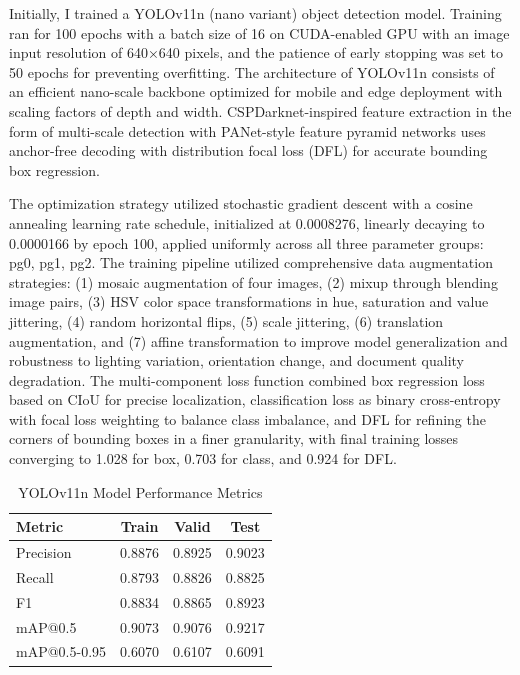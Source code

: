\documentclass[conference,twocolumn]{IEEEtran}
\begin{document}
Initially, I trained a YOLOv11n (nano variant) \cite{ref15} object detection
model. Training ran for 100 epochs with a batch size of 16 on
CUDA-enabled GPU with an image input resolution of 640×640 pixels, and
the patience of early stopping was set to 50 epochs for preventing
overfitting. The architecture of YOLOv11n consists of an efficient
nano-scale backbone optimized for mobile and edge deployment with
scaling factors of depth and width. CSPDarknet-inspired feature
extraction in the form of multi-scale detection with PANet-style feature
pyramid networks uses anchor-free decoding with distribution focal loss
(DFL) for accurate bounding box regression.

The optimization strategy utilized stochastic gradient descent with a
cosine annealing learning rate schedule, initialized at 0.0008276,
linearly decaying to 0.0000166 by epoch 100, applied uniformly across
all three parameter groups: pg0, pg1, pg2. The training pipeline
utilized comprehensive data augmentation strategies: (1) mosaic
augmentation of four images, (2) mixup through blending image pairs, (3)
HSV color space transformations in hue, saturation and value jittering,
(4) random horizontal flips, (5) scale jittering, (6) translation
augmentation, and (7) affine transformation to improve model
generalization and robustness to lighting variation, orientation change,
and document quality degradation. The multi-component loss function
combined box regression loss based on CIoU for precise localization,
classification loss as binary cross-entropy with focal loss weighting to
balance class imbalance, and DFL for refining the corners of bounding
boxes in a finer granularity, with final training losses converging to
1.028 for box, 0.703 for class, and 0.924 for DFL.

\begin{table}[htbp]
\caption{YOLOv11n Model Performance Metrics}
\label{tab:yolo}
\centering
\footnotesize
\begin{tabular}{lccc}
\toprule
Metric & Train & Valid & Test \\
\midrule
Precision & 0.8876 & 0.8925 & 0.9023 \\
Recall & 0.8793 & 0.8826 & 0.8825 \\
F1 & 0.8834 & 0.8865 & 0.8923 \\
mAP@0.5 & 0.9073 & 0.9076 & 0.9217 \\
mAP@0.5-0.95 & 0.6070 & 0.6107 & 0.6091 \\
\bottomrule
\end{tabular}
\end{table}
\end{document}
